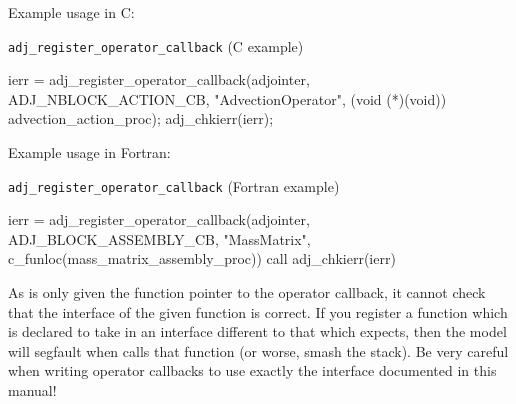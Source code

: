 Example usage in C:

\begin{boxwithtitle}{\texttt{adj_register_operator_callback} (C example)}
\begin{minipage}{\columnwidth}
\begin{ccode}
  ierr = adj_register_operator_callback(adjointer, ADJ_NBLOCK_ACTION_CB, 
                                   "AdvectionOperator",
                                   (void (*)(void)) advection_action_proc);
  adj_chkierr(ierr);
\end{ccode}
\end{minipage}
\end{boxwithtitle}

Example usage in Fortran:

\begin{boxwithtitle}{\texttt{adj_register_operator_callback} (Fortran example)}
\begin{minipage}{\columnwidth}
\begin{fortrancode}
  ierr = adj_register_operator_callback(adjointer, ADJ_BLOCK_ASSEMBLY_CB, 
                                    "MassMatrix",
                                    c_funloc(mass_matrix_assembly_proc))
  call adj_chkierr(ierr)
\end{fortrancode}
\end{minipage}
\end{boxwithtitle}

As \libadjoint is only given the function pointer to the operator callback, it cannot check that the
interface of the given function is correct. If you register a function which is declared to take 
in an interface different to that which \libadjoint expects, then the model will segfault when
\libadjoint calls that function (or worse, smash the stack). Be very careful when writing operator callbacks to use exactly
the interface documented in this manual!
